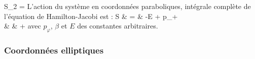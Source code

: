 	S_{2} =  \nonumber
\eea
L'action du syst\`{e}me en coordonn\'{e}es paraboliques, int\'{e}grale compl\`{e}te de l'\'{e}quation de Hamilton-Jacobi est :
\bea
	S & = & -E + p_{\varphi}\varphi +  \nonumber \\
	& & +  \label{EQ:48_16}
\eea
avec $p_{\varphi}$, $\beta$ et $E$ des constantes arbitraires.

\subsubsection{Coordonn\'{e}es elliptiques}\label{PAR:48_3_3}

